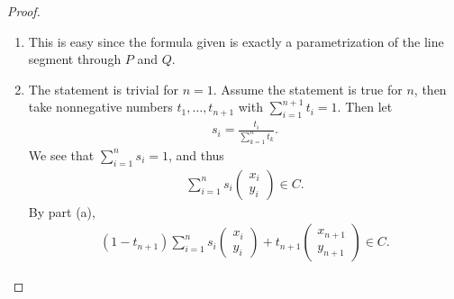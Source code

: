 \begin{proof}
    \begin{enumerate}
        \item This is easy since the formula given is exactly a parametrization of the line segment through $P$ and $Q$.
        \item The statement is trivial for $n=1$. 
        Assume the statement is true for $n$, then take nonnegative numbers $t_1,\dots,t_{n+1}$ with $\sum_{i=1}^{n+1} t_i = 1$. 
        Then let 
        \begin{align*}
            s_i = \frac{t_i}{\sum_{k=1}^n t_k}.
        \end{align*}
        We see that $\sum_{i=1}^n s_i = 1$, and thus
        \begin{align*}
            \sum_{i=1}^n s_i \left(\begin{array}{c} x_i\\ y_i\end{array}\right)\in C.
        \end{align*}
        By part (a),
        \begin{align*}
            (1 - t_{n+1})\sum_{i=1}^n s_i 
            \left(\begin{array}{c} 
                x_i\\ 
                y_i\end{array}\right) 
            + t_{n+1}
            \left(\begin{array}{c} 
                x_{n+1}\\ 
                y_{n+1}\end{array}\right)
            \in C.
        \end{align*}
    

\end{enumerate}
\end{proof}
